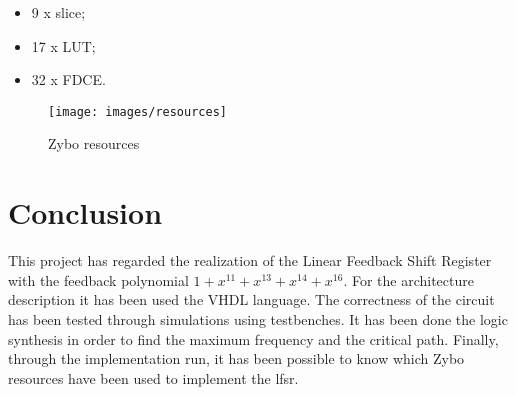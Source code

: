 \documentclass[11pt,a4paper,oneside, openright]{article}
\begin{document}
\begin{itemize}
    \item 9 x slice;
    \item 17 x LUT;
    \item 32 x FDCE.
\end{itemize}

\begin{figure}[h]
    \centering
    \texttt{[image: images/resources]}
    \caption{Zybo resources}
    \label{fig:resources}
\end{figure}

\section{Conclusion}
This project has regarded the realization of the Linear Feedback Shift Register with the feedback polynomial $ 1 + x^{11} + x^{13} + x^{14} + x^{16} $. For the architecture description it has been used the VHDL language. The correctness of the circuit has been tested through simulations using testbenches. It has been done the logic synthesis in order to find the maximum frequency and the critical path. Finally, through the implementation run, it has been possible to know which Zybo resources have been used to implement the lfsr.

\newpage

\begin{appendix}
    \listoffigures
    \lstlistoflistings
\end{appendix}
\end{document}
